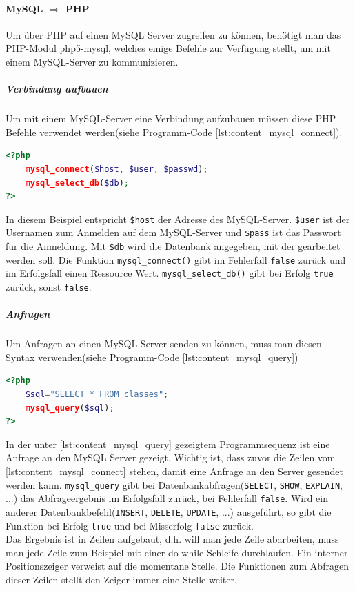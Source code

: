\paragraph{MySQL $ \Rightarrow $ PHP}
Um über PHP auf einen MySQL Server zugreifen zu können, benötigt man das PHP-Modul php5-mysql, welches einige Befehle zur Verfügung stellt, um mit einem MySQL-Server zu kommunizieren.\\
\subparagraph{Verbindung aufbauen}
Um mit einem MySQL-Server eine Verbindung aufzubauen müssen diese PHP Befehle verwendet werden(siehe Programm-Code \ref{lst:content_mysql_connect}).
\begin{lstlisting}[style=custom, language=PHP, caption={MySQL Connect},label={lst:content_mysql_connect}]
<?php 
	mysql_connect($host, $user, $passwd);
	mysql_select_db($db);
?>
\end{lstlisting}
In diesem Beispiel entspricht \texttt{\$host} der Adresse des MySQL-Server. \texttt{\$user} ist der Usernamen zum Anmelden auf dem MySQL-Server und \texttt{\$pass} ist das Passwort für die Anmeldung. Mit \texttt{\$db} wird die Datenbank angegeben, mit der gearbeitet werden soll. Die Funktion \texttt{mysql\_connect()} gibt im Fehlerfall \texttt{false} zurück und im Erfolgsfall einen Ressource Wert. \texttt{mysql\_select\_db()} gibt bei Erfolg \texttt{true} zurück, sonst \texttt{false}.
\subparagraph{Anfragen}
Um Anfragen an einen MySQL Server senden zu können, muss man diesen Syntax verwenden(siehe Programm-Code \ref{lst:content_mysql_query})
\begin{lstlisting}[style=custom, language=PHP, caption={MySQL Querys},label={lst:content_mysql_query}]
<?php 
	$sql="SELECT * FROM classes";
	mysql_query($sql);
?>
\end{lstlisting}
In der unter \ref{lst:content_mysql_query} gezeigtem Programmsequenz ist eine Anfrage an den MySQL Server gezeigt. Wichtig ist, dass zuvor die Zeilen vom \autoref{lst:content_mysql_connect} stehen, damit eine Anfrage an den Server gesendet werden kann. \texttt{mysql\_query} gibt bei Datenbankabfragen(\texttt{SELECT}, \texttt{SHOW}, \texttt{EXPLAIN}, ...) das Abfrageergebnis im Erfolgsfall zurück, bei Fehlerfall \texttt{false}. Wird ein anderer Datenbankbefehl(\texttt{INSERT}, \texttt{DELETE}, \texttt{UPDATE}, ...) ausgeführt, so gibt die Funktion bei Erfolg \texttt{true} und bei Misserfolg \texttt{false} zurück.\\
Das Ergebnis ist in Zeilen aufgebaut, d.h. will man jede Zeile abarbeiten, muss man jede Zeile zum Beispiel mit einer do-while-Schleife durchlaufen. Ein interner Positionszeiger verweist auf die momentane Stelle. Die Funktionen zum Abfragen dieser Zeilen stellt den Zeiger immer eine Stelle weiter.\\

